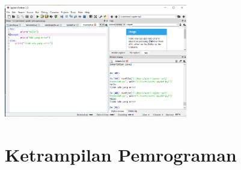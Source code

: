        \paragraph{}
        \centerline{\includegraphics[width=8cm]{figures/tryexcept.PNG}}

\section{Ketrampilan Pemrograman}
